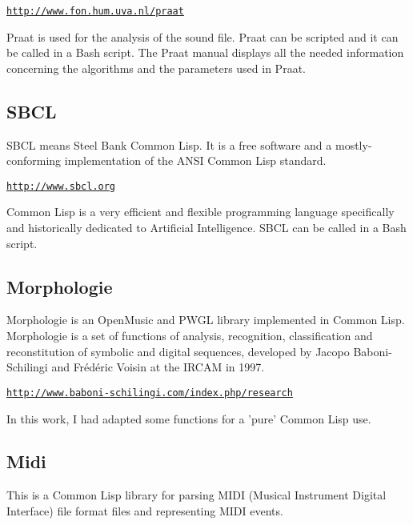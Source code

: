 \href{http://www.fon.hum.uva.nl/praat}{\texttt{\small http://www.fon.hum.uva.nl/praat}}

\bigskip

Praat is used for the analysis of the sound file. Praat can be scripted and it can be called in a Bash script. The Praat manual displays all the needed information concerning the algorithms and the parameters used in Praat.

\subsection*{SBCL}

SBCL means Steel Bank Common Lisp. It is a free software and a mostly-conforming implementation of the ANSI Common Lisp standard.

\href{http://www.sbcl.org}{\texttt{\small http://www.sbcl.org}}

\bigskip

Common Lisp is a very efficient and flexible programming language specifically and historically dedicated to Artificial Intelligence.
SBCL can be called in a Bash script.

\subsection*{Morphologie}

Morphologie is an OpenMusic and PWGL library implemented in Common Lisp. Morphologie is a set of functions of analysis, recognition, classification and reconstitution of symbolic and digital sequences, developed by Jacopo Baboni-Schilingi and Fr\'ed\'eric Voisin at the IRCAM in 1997.

\href{http://www.baboni-schilingi.com/index.php/research}{\texttt{\small http://www.baboni-schilingi.com/index.php/research}}


\bigskip

In this work, I had adapted some functions for a 'pure' Common Lisp use.

\subsection*{Midi}

This is a Common Lisp library for parsing MIDI (Musical Instrument Digital Interface) file format files and representing MIDI events.

